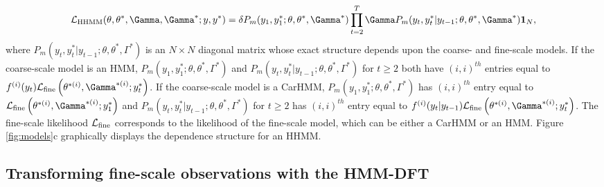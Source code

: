 \begin{equation}
    \calL_{\text{HHMM}}(\theta,\theta^*,\Gamma,\Gamma^*;y,y^*) = \delta P_m(y_1,y_1^*;\theta,\theta^*,\Gamma^*) \prod_{t=2}^T \Gamma P_m(y_t,y_t^*|y_{t-1};\theta,\theta^*,\Gamma^*) \mathbf{1}_N,
    \label{eqn:HHMM_likelihood}
\end{equation}
%
where $P_m(y_t,y_t^*|y_{t-1};\theta,\theta^*,\Gamma^*)$ is an $N \times N$ diagonal matrix whose exact structure depends upon the coarse- and fine-scale models. If the coarse-scale model is an HMM, $P_m(y_1,y_1^*;\theta,\theta^*,\Gamma^*)$ and $P_m(y_t,y_t^*|y_{t-1};\theta,\theta^*,\Gamma^*)$ for $t \geq 2$ both have $(i,i)^{th}$ entries equal to 
$f^{(i)}(y_t)\calL_{\text{fine}}\left(\theta^{*(i)},
\Gamma^{*(i)};y_t^*\right)$. 
If the coarse-scale model is a CarHMM, $P_m(y_1,y_1^*;\theta,\theta^*,\Gamma^*)$ has $(i,i)^{th}$ entry equal to $\calL_{\text{fine}}\left(\theta^{*(i)},
\Gamma^{*(i)};y_1^*\right)$ and $P_m(y_t,y_t^*|y_{t-1};\theta,\theta^*,\Gamma^*)$ for $t \geq 2$ has $(i,i)^{th}$ entry equal to $f^{(i)}(y_t|y_{t-1})\calL_{\text{fine}}\left(\theta^{*(i)},
\Gamma^{*(i)};y_t^*\right)$.
The fine-scale likelihood $\mathcal{L}_{\text{fine}}$ corresponds to the likelihood of the fine-scale model, which can be either a CarHMM or an HMM. Figure \ref{fig:models}c graphically displays the dependence structure for an HHMM.

\subsection{Transforming fine-scale observations with the HMM-DFT}
\label{subsec:STFT}

